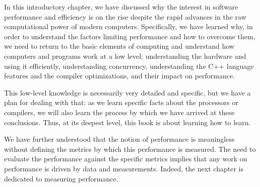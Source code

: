 In this introductory chapter, we have discussed why the interest in software performance and efficiency is on the rise despite the rapid advances in the raw computational power of modern computers. Specifically, we have learned why, in order to understand the factors limiting performance and how to overcome them, we need to return to the basic elements of computing and understand how computers and programs work at a low level: understanding the hardware and using it efficiently, understanding concurrency, understanding the C++ language features and the compiler optimizations, and their impact on performance.

This low-level knowledge is necessarily very detailed and specific, but we have a plan for dealing with that: as we learn specific facts about the processors or compilers, we will also learn the process by which we have arrived at these conclusions. Thus, at its deepest level, this book is about learning how to learn.

We have further understood that the notion of performance is meaningless without defining the metrics by which this performance is measured. The need to evaluate the performance against the specific metrics implies that any work on performance is driven by data and measurements. Indeed, the next chapter is dedicated to measuring performance.